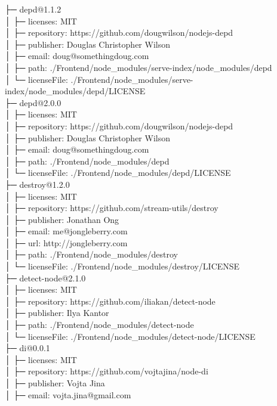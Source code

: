├─ depd@1.1.2\\
│  ├─ licenses: MIT\\
│  ├─ repository: https://github.com/dougwilson/nodejs-depd\\
│  ├─ publisher: Douglas Christopher Wilson\\
│  ├─ email: doug@somethingdoug.com\\
│  ├─ path: ./Frontend/node\_modules/serve-index/node\_modules/depd\\
│  └─ licenseFile: ./Frontend/node\_modules/serve-index/node\_modules/depd/LICENSE\\
├─ depd@2.0.0\\
│  ├─ licenses: MIT\\
│  ├─ repository: https://github.com/dougwilson/nodejs-depd\\
│  ├─ publisher: Douglas Christopher Wilson\\
│  ├─ email: doug@somethingdoug.com\\
│  ├─ path: ./Frontend/node\_modules/depd\\
│  └─ licenseFile: ./Frontend/node\_modules/depd/LICENSE\\
├─ destroy@1.2.0\\
│  ├─ licenses: MIT\\
│  ├─ repository: https://github.com/stream-utils/destroy\\
│  ├─ publisher: Jonathan Ong\\
│  ├─ email: me@jongleberry.com\\
│  ├─ url: http://jongleberry.com\\
│  ├─ path: ./Frontend/node\_modules/destroy\\
│  └─ licenseFile: ./Frontend/node\_modules/destroy/LICENSE\\
├─ detect-node@2.1.0\\
│  ├─ licenses: MIT\\
│  ├─ repository: https://github.com/iliakan/detect-node\\
│  ├─ publisher: Ilya Kantor\\
│  ├─ path: ./Frontend/node\_modules/detect-node\\
│  └─ licenseFile: ./Frontend/node\_modules/detect-node/LICENSE\\
├─ di@0.0.1\\
│  ├─ licenses: MIT\\
│  ├─ repository: https://github.com/vojtajina/node-di\\
│  ├─ publisher: Vojta Jina\\
│  ├─ email: vojta.jina@gmail.com\\
